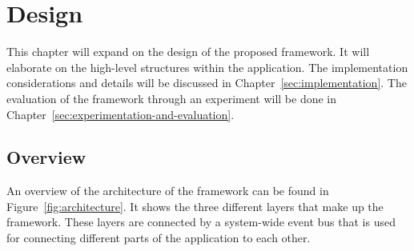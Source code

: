 \chapter{\label{sec:design}Design}



This chapter will expand on the design of the proposed framework. It will elaborate on the high-level structures within the application. The implementation considerations and details will be discussed in Chapter~\ref{sec:implementation}. The evaluation of the framework through an experiment will be  done in Chapter~\ref{sec:experimentation-and-evaluation}.

\section{Overview}

An overview of the architecture of the framework can be found in Figure~\ref{fig:architecture}. It shows the three different layers that make up the framework. These layers are connected by a system-wide event bus that is used for connecting different parts of the application to each other.

